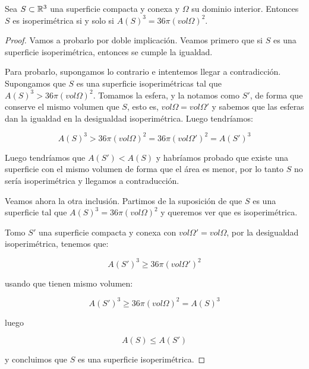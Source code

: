 \begin{corolario}
Sea $S \subset \mathbb{R}^3$ una superficie compacta y conexa y $\Omega$ su dominio interior. Entonces $S$ es isoperimétrica si y solo si $A(S)^3 = 36\pi (vol \Omega)^2$.
\end{corolario}
\begin{proof}
Vamos a probarlo por doble implicación. Veamos primero que si $S$ es una superficie isoperimétrica, entonces se cumple la igualdad.

Para probarlo, supongamos lo contrario e intentemos llegar a contradicción. Supongamos que $S$ es una superficie isoperimétricas tal que $A(S)^3 > 36\pi (vol \Omega)^2$. Tomamos la esfera, y la notamos como $S'$, de forma que conserve el mismo volumen que $S$, esto es, $vol \Omega = vol \Omega'$ y sabemos que las esferas dan la igualdad en la desigualdad isoperimétrica. Luego tendríamos:

\begin{equation*}
    A(S)^3 > 36\pi (vol \Omega)^2 = 36\pi (vol \Omega')^2 = A(S')^3
\end{equation*}

Luego tendríamos que $A(S') < A(S)$ y habríamos probado que existe una superficie con el mismo volumen de forma que el área es menor, por lo tanto $S$ no sería isoperimétrica y llegamos a contraducción.

Veamos ahora la otra inclusión. Partimos de la suposición de que $S$ es una superficie tal que $A(S)^3 = 36\pi (vol \Omega)^2$ y queremos ver que es isoperimétrica.

Tomo $S'$ una superficie compacta y conexa con $vol \Omega' = vol \Omega$, por la desigualdad isoperimétrica, tenemos que:

\begin{equation*}
    A(S')^3 \geq 36\pi (vol \Omega')^2
\end{equation*}

usando que tienen mismo volumen:

\begin{equation*}
     A(S')^3 \geq 36\pi (vol \Omega)^2 = A(S)^3
\end{equation*}

luego

\begin{equation*}
    A(S) \leq A(S')
\end{equation*}

y concluimos que $S$ es una superficie isoperimétrica.
\end{proof}
